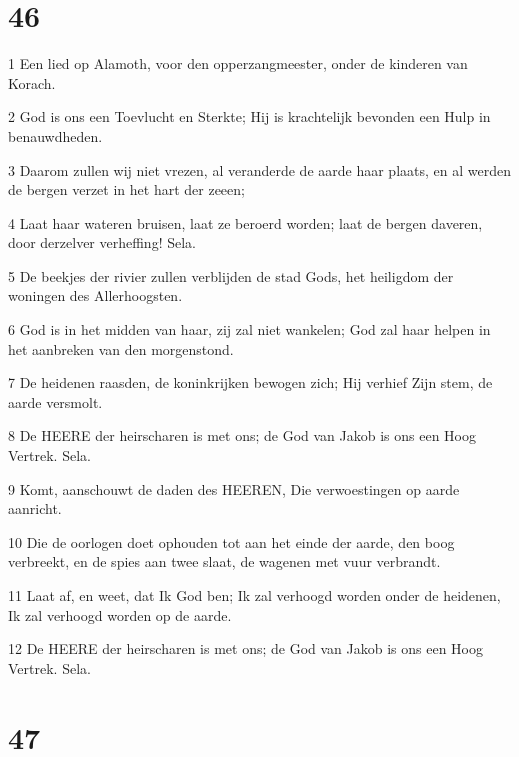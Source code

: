 \chapter{46}

\par 1 Een lied op Alamoth, voor den opperzangmeester, onder de kinderen van Korach.
\par 2 God is ons een Toevlucht en Sterkte; Hij is krachtelijk bevonden een Hulp in benauwdheden.
\par 3 Daarom zullen wij niet vrezen, al veranderde de aarde haar plaats, en al werden de bergen verzet in het hart der zeeen;
\par 4 Laat haar wateren bruisen, laat ze beroerd worden; laat de bergen daveren, door derzelver verheffing! Sela.
\par 5 De beekjes der rivier zullen verblijden de stad Gods, het heiligdom der woningen des Allerhoogsten.
\par 6 God is in het midden van haar, zij zal niet wankelen; God zal haar helpen in het aanbreken van den morgenstond.
\par 7 De heidenen raasden, de koninkrijken bewogen zich; Hij verhief Zijn stem, de aarde versmolt.
\par 8 De HEERE der heirscharen is met ons; de God van Jakob is ons een Hoog Vertrek. Sela.
\par 9 Komt, aanschouwt de daden des HEEREN, Die verwoestingen op aarde aanricht.
\par 10 Die de oorlogen doet ophouden tot aan het einde der aarde, den boog verbreekt, en de spies aan twee slaat, de wagenen met vuur verbrandt.
\par 11 Laat af, en weet, dat Ik God ben; Ik zal verhoogd worden onder de heidenen, Ik zal verhoogd worden op de aarde.
\par 12 De HEERE der heirscharen is met ons; de God van Jakob is ons een Hoog Vertrek. Sela.

\chapter{47}

